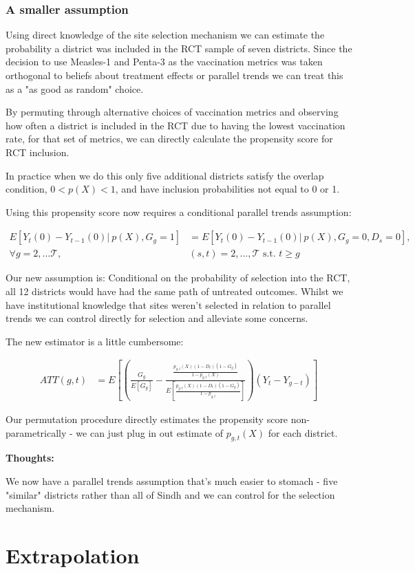 \documentclass{article}
\begin{document}
   \subsubsection*{A smaller assumption}

   Using direct knowledge of the site selection mechanism we can estimate the 
   probability a district was included in the RCT sample of seven districts. Since the 
   decision to use Measles-1 and Penta-3 as the vaccination metrics was taken 
   orthogonal to beliefs about treatment effects or parallel trends we can 
   treat this as a "as good as random" choice.  

   By permuting through alternative choices of vaccination metrics and observing 
   how often a district is included in the RCT due to having the lowest vaccination 
   rate, for that set of metrics, we can directly calculate the propensity 
   score for RCT inclusion.
   
   In practice when we do this only five additional districts satisfy the overlap 
   condition, $0 < p(X) < 1$, and have inclusion probabilities not equal to 0 or 1. 

   Using this propensity score now requires a conditional parallel trends assumption:

   


\begin{align*}
   E\left[Y_t(0) - Y_{t-1}(0) |\  p(X), G_g = 1\right] &= 
   E\left[
      Y_t(0) - Y_{t-1}(0) |\  p(X), G_g  = 0 , D_s = 0
   \right],  \\ \forall g = 2, ... \mathcal{T}, & (s,t) = 2, ..., \mathcal{T} \text{ s.t. } t \geq g
\end{align*}


Our new assumption is: Conditional on the probability of selection into the RCT, 
all 12 districts would have had the same path of untreated outcomes. Whilst 
we have institutional knowledge that sites weren't selected in relation to 
parallel trends we can control directly for selection and alleviate some concerns. 

The new estimator is a little cumbersome:

\begin{align*}
  ATT(g,t) &= E\left[
     \left(
   \frac{G_g}{E[G_g]} -
   \frac{\frac{
      p_{g,t}(X)(1 - D_t)(1 - G_g)
   }{
      1 - p_{g,t}(X)
   }}{
  E\left[    \frac{
   p_{g,t}(X)(1 - D_t)(1 - G_g)
      }{1 - p_{g,t}}
   \right]
      }
     \right)
     (Y_t - Y_{g-t})
  \right] 
\end{align*}


Our permutation procedure directly estimates the propensity score non-parametrically -
we can just plug in out estimate of $p_{g,t}(X)$ for each district.

\textbf{Thoughts:}


We now have a parallel trends assumption that's much easier to stomach - 
five "similar" districts rather than all of Sindh and we can control  
for the selection mechanism.


\section{Extrapolation}
\end{document}

